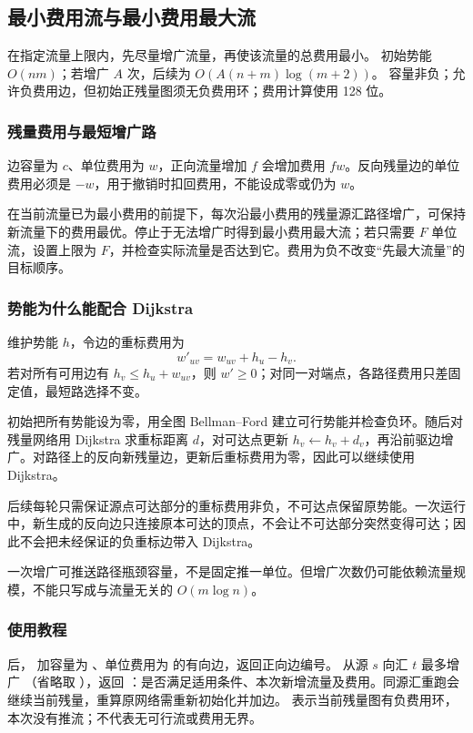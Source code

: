 \subsection{最小费用流与最小费用最大流}
\label{algo:min-cost-flow}
\AlgorithmInfo
    {在指定流量上限内，先尽量增广流量，再使该流量的总费用最小。}
    {初始势能 $O(nm)$；若增广 $A$ 次，后续为 $O(A(n+m)\log(m+2))$。}
    {容量非负；允许负费用边，但初始正残量图须无负费用环；费用计算使用 128 位。}

\subsubsection*{残量费用与最短增广路}
边容量为 $c$、单位费用为 $w$，正向流量增加 $f$ 会增加费用 $fw$。反向残量边的单位费用必须是 $-w$，用于撤销时扣回费用，不能设成零或仍为 $w$。

在当前流量已为最小费用的前提下，每次沿最小费用的残量源汇路径增广，可保持新流量下的费用最优。停止于无法增广时得到最小费用最大流；若只需要 $F$ 单位流，设置上限为 $F$，并检查实际流量是否达到它。费用为负不改变“先最大流量”的目标顺序。

\subsubsection*{势能为什么能配合 Dijkstra}
维护势能 $h$，令边的重标费用为
\[
    w'_{uv}=w_{uv}+h_u-h_v.
\]
若对所有可用边有 $h_v\leq h_u+w_{uv}$，则 $w'\geq0$；对同一对端点，各路径费用只差固定值，最短路选择不变。

初始把所有势能设为零，用全图 Bellman--Ford 建立可行势能并检查负环。随后对残量网络用 Dijkstra 求重标距离 $d$，对可达点更新 $h_v\gets h_v+d_v$，再沿前驱边增广。对路径上的反向新残量边，更新后重标费用为零，因此可以继续使用 Dijkstra。

后续每轮只需保证源点可达部分的重标费用非负，不可达点保留原势能。一次运行中，新生成的反向边只连接原本可达的顶点，不会让不可达部分突然变得可达；因此不会把未经保证的负重标边带入 Dijkstra。

一次增广可推送路径瓶颈容量，不是固定推一单位。但增广次数仍可能依赖流量规模，不能只写成与流量无关的 $O(m\log n)$。

\subsubsection*{使用教程}
 后， 加容量为 、单位费用为  的有向边，返回正向边编号。 从源 $s$ 向汇 $t$ 最多增广 （省略取 ），返回 ：是否满足适用条件、本次新增流量及费用。同源汇重跑会继续当前残量，重算原网络需重新初始化并加边。 表示当前残量图有负费用环，本次没有推流；不代表无可行流或费用无界。

